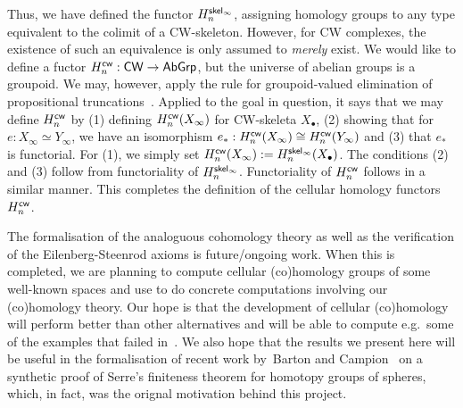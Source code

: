 \documentclass[a4page]{article}
\begin{document}
Thus, we have defined the functor $\textnormal{\ensuremath{H^{\mathsf{skel}_\infty}_{n}}}$, assigning homology groups to any type equivalent to the colimit of a CW-skeleton. However, for CW complexes, the existence of such an equivalence is only assumed to \emph{merely} exist. We would like to define a fuctor $\textnormal{\ensuremath{H^{\mathsf{cw}}_{n}}} : \mathsf{CW} \to \textnormal{\ensuremath{\mathsf{AbGrp}}}$, but the universe of abelian groups is a groupoid. We may, however, apply the rule for groupoid-valued elimination of propositional truncations~\cite[Proposition 3]{KrausTruncation}. Applied to the goal in question, it says that we may define $\textnormal{\ensuremath{H^{\mathsf{cw}}_{n}}}$ by (1) defining $\textnormal{\ensuremath{H^{\mathsf{cw}}_{n}}}(X_\infty)$ for CW-skeleta $X_\bullet$, (2) showing that for $e : X_\infty \simeq Y_{\infty}$, we have an isomorphism $e_* : \textnormal{\ensuremath{H^{\mathsf{cw}}_{n}}}(X_\infty) \cong \textnormal{\ensuremath{H^{\mathsf{cw}}_{n}}}(Y_\infty)$ and (3) that $e_*$ is functorial. For (1), we simply set $\textnormal{\ensuremath{H^{\mathsf{cw}}_{n}}}(X_\infty) := \textnormal{\ensuremath{H^{\mathsf{skel}_\infty}_{n}}}(X_\bullet)$. The conditions (2) and (3) follow from functoriality of $\textnormal{\ensuremath{H^{\mathsf{skel}_\infty}_{n}}}$. Functoriality of $\textnormal{\ensuremath{H^{\mathsf{cw}}_{n}}}$ follows in a similar manner. This completes the definition of the cellular homology functors~$\textnormal{\ensuremath{H^{\mathsf{cw}}_{n}}}$.

The formalisation of the analoguous cohomology theory as well as the verification of the Eilenberg-Steenrod axioms is future/ongoing work. When this is completed, we are planning to compute cellular (co)homology groups of some well-known spaces and use \CubicalAgda to do concrete computations involving our (co)homology theory. Our hope is that the development of cellular (co)homology will perform better than other alternatives and will be able to compute e.g.\ some of the examples that failed in~\cite[Section 6]{BLM22}. We also hope that the results we present here will be useful in the formalisation of recent work by~Barton and Campion~\cite{SerreFiniteness} on a synthetic proof of Serre's finiteness theorem for homotopy groups of spheres, which, in fact, was the orignal motivation behind this project.

\printbibliography
\end{document}
